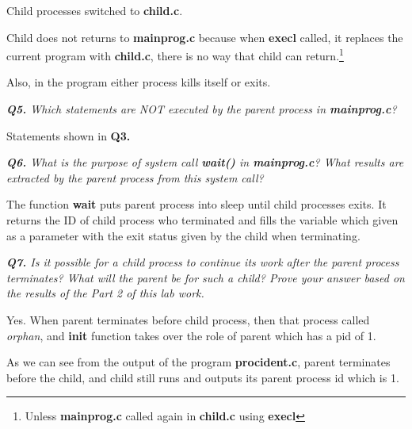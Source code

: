 \documentclass[11pt]{article}
\begin{document}
Child processes switched to \textbf{child.c}.

Child does not returns to \textbf{mainprog.c} because when \textbf{execl} called, it replaces the current program with \textbf{child.c}, there is no way that child can return.\footnote{Unless \textbf{mainprog.c} called again in \textbf{child.c} using \textbf{execl}}

Also, in the program either process kills itself or exits.

\vspace{5mm}
\textit{\textbf{Q5.} Which statements are NOT executed by the parent process in \textbf{mainprog.c}?}
\vspace{5mm}

Statements shown in \textbf{Q3.}

\vspace{5mm}
\textit{\textbf{Q6.} What is the purpose of system call \textbf{wait()} in \textbf{mainprog.c}? What results are extracted by the parent process from this system call?}
\vspace{5mm}

The function \textbf{wait} puts parent process into sleep until child processes exits. It returns the ID of child process who terminated and fills the variable which given as a parameter with the exit status given by the child when terminating.

\vspace{5mm}
\textit{\textbf{Q7.} Is it possible for a child process to continue its work after the parent process terminates? What will the parent be for such a child? Prove your answer based on the results of the Part 2 of this lab work.}
\vspace{5mm}

Yes. When parent terminates before child process, then that process called \textit{orphan}, and \textbf{init} function takes over the role of parent which has a pid of 1.

As we can see from the output of the program \textbf{procident.c}, parent terminates before the child, and child still runs and outputs its parent process id which is 1.
\end{document}
